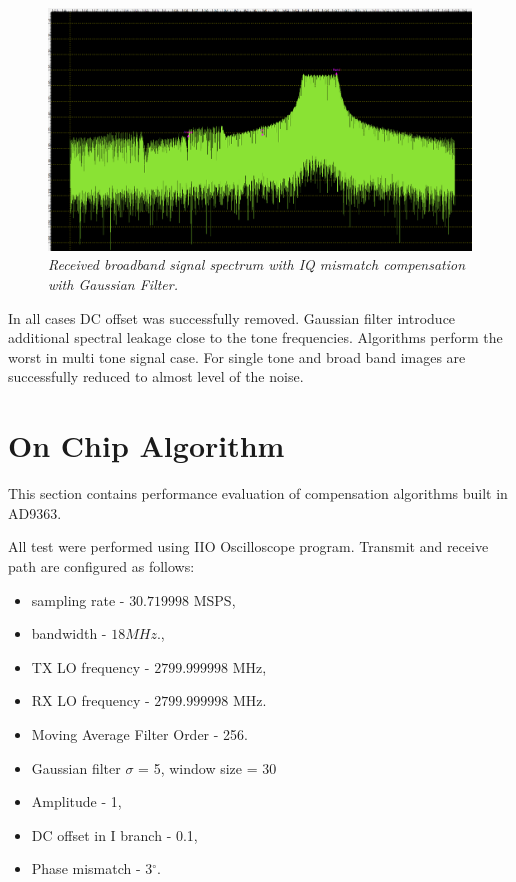 \documentclass[en,printmode]{mgr}
\begin{document}
   		\begin{figure}[!htb]
    		\centering
   			\includegraphics[width=\textwidth]{plots/my_band_gauss.png}
   		 	\caption{\textit{Received broadband signal spectrum with IQ mismatch compensation with
   		 	Gaussian Filter.}}
   		\end{figure}
   		
   		\newpage
		In all cases DC offset was successfully removed. Gaussian filter introduce additional spectral
		leakage close to the tone frequencies. Algorithms perform the worst in multi tone signal case.
		For single tone and broad band images are successfully reduced to almost level of the noise.	
   		
	\section{On Chip Algorithm}
		This section contains performance evaluation of compensation algorithms built in AD9363.
	
		All test were performed using IIO Oscilloscope program.
		Transmit and receive path are configured as follows:
		\begin{itemize}
			\item sampling rate - $30.719998$ MSPS,
			\item bandwidth - $18MHz$.,
			\item TX LO frequency - $2799.999998$ MHz,
			\item RX LO frequency - $2799.999998$ MHz.
		\end{itemize}

		\begin{itemize}
			\item Moving Average Filter Order - 256.
			\item Gaussian filter $\sigma$ = 5, window size = 30
			\item Amplitude - 1,
			\item DC offset in I branch - 0.1,
			\item Phase mismatch - 3$^\circ$.
		\end{itemize}
	    \newpage
\end{document}
